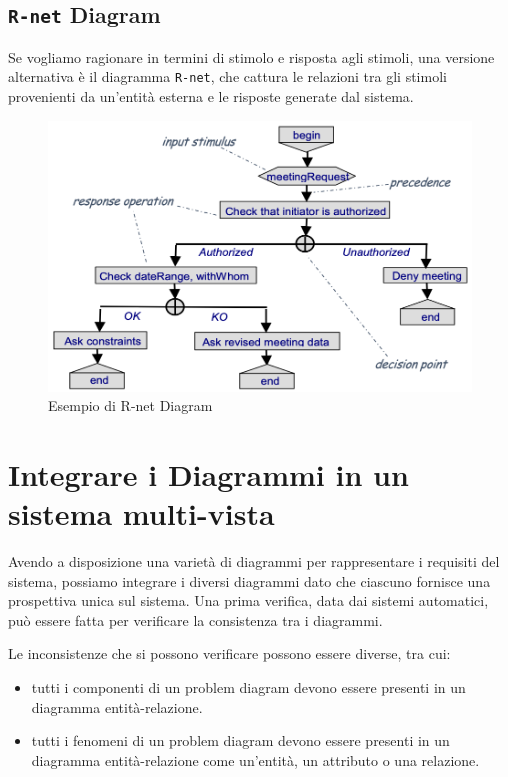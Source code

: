 \subsection{\texttt{R-net} Diagram}
Se vogliamo ragionare in termini di stimolo e risposta agli stimoli, 
una versione alternativa è il diagramma \texttt{R-net}, che cattura le relazioni
tra gli stimoli provenienti da un'entità esterna e le risposte generate dal sistema.
\begin{figure}[H]
    \centering
    \includegraphics[scale=0.4]{img/rnet.png}
    \caption{Esempio di R-net Diagram}
\end{figure}
\section{Integrare i Diagrammi in un sistema multi-vista}
Avendo a disposizione una varietà di diagrammi per
rappresentare i requisiti del sistema, possiamo integrare i diversi diagrammi dato 
che ciascuno fornisce una prospettiva unica sul sistema. 
Una prima verifica, data dai sistemi automatici, può essere fatta per verificare
la consistenza tra i diagrammi. 

Le inconsistenze che si possono verificare possono essere diverse, tra cui:
\begin{itemize}
    \item tutti i componenti di un problem diagram devono essere presenti
    in un diagramma entità-relazione.
    \item tutti i fenomeni di un problem diagram devono essere presenti
    in un diagramma entità-relazione come un'entità, un attributo o una relazione.
\end{itemize}


